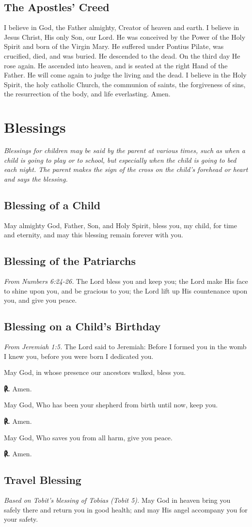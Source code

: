 \documentclass[12pt]{article}
\makeatletter
\newcommand{\prayersection}[1]{\section{#1}}
\newcommand{\prayertitle}[1]{\subsection{#1}}
\newcommand{\indulgencedprayertitle}[1]{\prayertitle{#1 \protect\kreuz}}
\newcommand{\emphasis}[1]{\emph{#1}}
\newcommand{\emphasis}[1]{\textsl{#1}}
\newcommand{\note}[1]{{\small{\emphasis{#1}}}\newline}
\newcommand{\response}{{\setmainfont{Times New Roman}\textbf{℟.}}\xspace}
\DeclareRobustCommand{\response}{\textbf{\vers@resp{0pt}{R}.}\xspace}
\newcommand{\vers@resp@sym}{\raisebox{0.2ex}{\rotatebox[origin=c]{-20}{$\m@th\rceil$}}}
\newcommand{\vers@resp}[2]{%
		{\ooalign{\hidewidth\kern#1\vers@resp@sym\hidewidth\cr#2\cr}}%
	}
\makeatother
\begin{document}
\indulgencedprayertitle{The Apostles' Creed}
I believe in God, the Father almighty, Creator of heaven and earth.
I believe in Jesus Christ, His only Son, our Lord.
He was conceived by the Power of the Holy Spirit and born of the Virgin Mary.
He suffered under Pontius Pilate, was crucified, died, and was buried.
He descended to the dead.
On the third day He rose again.
He ascended into heaven, and is seated at the right Hand of the Father.
He will come again to judge the living and the dead.
I believe in the Holy Spirit, the holy catholic Church, the communion of saints, the forgiveness of sins, the resurrection of the body, and life everlasting.
Amen.

\newpage

\prayersection{Blessings}
\note{Blessings for children may be said by the parent at various times, such as when a child is going to play or to school, but especially when the child is going to bed each night.
The parent makes the sign of the cross on the child's forehead or heart and says the blessing.}

\prayertitle{Blessing of a Child}
\label{prayer:blessing_child}
May almighty God, Father, Son, and Holy Spirit, bless you, my child, for time and eternity, and may this blessing remain forever with you.

\prayertitle{Blessing of the Patriarchs}
\label{prayer:blessing_patriarchs}
\note{From Numbers 6:24-26.}
The Lord bless you and keep you;
the Lord make His face to shine upon you, and be gracious to you;
the Lord lift up His countenance upon you, and give you peace.

\prayertitle{Blessing on a Child's Birthday}
\label{prayer:blessing_child_birthday}
\note{From Jeremiah 1:5.}
The Lord said to Jeremiah:
Before I formed you in the womb I knew you, before you were born I dedicated you.

May God, in whose presence our ancestors walked, bless you.

\response Amen.

May God, Who has been your shepherd from birth until now, keep you.

\response Amen.

May God, Who saves you from all harm, give you peace.

\response Amen.
\newpage
\prayertitle{Travel Blessing}
\label{prayer:travel_blessing}
\note{Based on Tobit's blessing of Tobias (Tobit 5).}
May God in heaven bring you safely there and return you in good health;
and may His angel accompany you for your safety.
\end{document}
